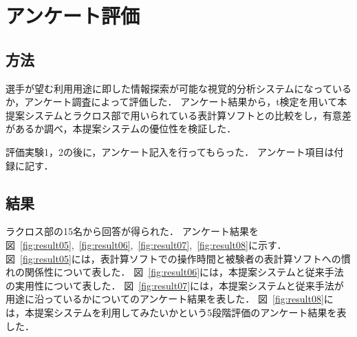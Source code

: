 \documentclass[sotsuron]{kuee}
\begin{document}
	\section{アンケート評価}
		\subsection{方法}
			選手が望む利用用途に即した情報探索が可能な視覚的分析システムになっているか，アンケート調査によって評価した．
			アンケート結果から，t検定を用いて本提案システムとラクロス部で用いられている表計算ソフトとの比較をし，有意差があるか調べ，本提案システムの優位性を検証した．
			
			評価実験1，2の後に，アンケート記入を行ってもらった．
			アンケート項目は付録に記す．
		\subsection{結果}
			ラクロス部の15名から回答が得られた．
			アンケート結果を図~\ref{fig:result05},~\ref{fig:result06},~\ref{fig:result07},~\ref{fig:result08}に示す．
			図~\ref{fig:result05}には，表計算ソフトでの操作時間と被験者の表計算ソフトへの慣れの関係性について表した．
			図~\ref{fig:result06}には，本提案システムと従来手法の実用性について表した．
			図~\ref{fig:result07}には，本提案システムと従来手法が用途に沿っているかについてのアンケート結果を表した．
			図~\ref{fig:result08}には，本提案システムを利用してみたいかという5段階評価のアンケート結果を表した．
			
\end{document}
